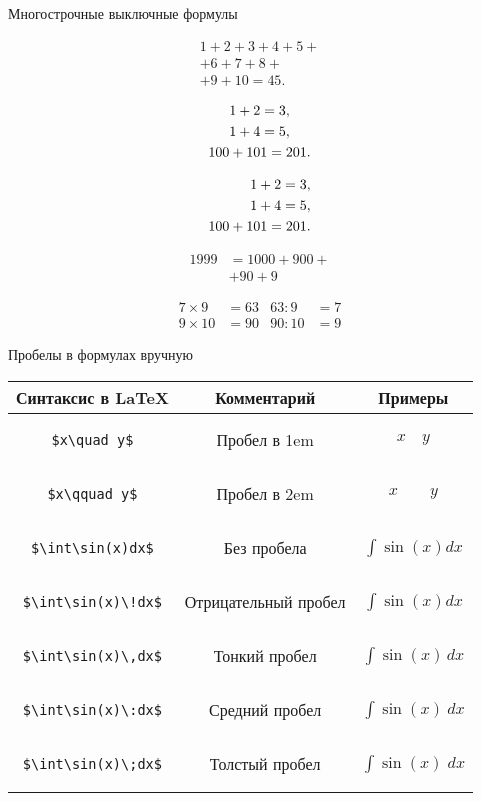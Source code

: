 \documentclass[a4paper, 14pt]{article}
\begin{document}
Многострочные выключные формулы

\begin{multline*} 
1+2+3+4+5+ \\
+6+7+8+ \\
 +9+10 = 45. 
\end{multline*}

\begin{gather} %
1+2=3, \notag \\
1+4=5, \\
100+101 = 201.
\end{gather}

\begin{align}  %
1+2=3, \\
1+4=5, \notag \\
100+101 = 201.
\end{align}


\begin{equation}
\begin{split}
1999&=1000+900+{}\\
&+90+9
\end{split}
\end{equation}

\begin{align}
7\times 9& =63 & 63:9& =7\\
9\times 10& =90 & 90:10& =9
\end{align}


Пробелы в формулах вручную \\
\begin{tabular}{|c|c|c|}
\hline
Синтаксис в \LaTeX & Комментарий & Примеры \\ \hline
\begin{lstlisting}
$x\quad y$
\end{lstlisting}
& Пробел в 1em
& $x\quad y$ \\ \hline
\begin{lstlisting}
$x\qquad y$
\end{lstlisting}
& Пробел в 2em
& $x\qquad y$ \\ \hline
\begin{lstlisting}
$\int\sin(x)dx$
\end{lstlisting}
& Без пробела
& $\int\sin(x)dx$\\ \hline
\begin{lstlisting}
$\int\sin(x)\!dx$
\end{lstlisting}
& Отрицательный пробел
& $\int\sin(x)\!dx$\\ \hline
\begin{lstlisting}
$\int\sin(x)\,dx$
\end{lstlisting}
& Тонкий пробел
& $\int\sin(x)\,dx$\\ \hline
\begin{lstlisting}
$\int\sin(x)\:dx$
\end{lstlisting}
& Средний пробел
& $\int\sin(x)\:dx$\\ \hline
\begin{lstlisting}
$\int\sin(x)\;dx$
\end{lstlisting}
& Толстый пробел
& $\int\sin(x)\;dx$\\ \hline
\end{tabular}
\end{document}
